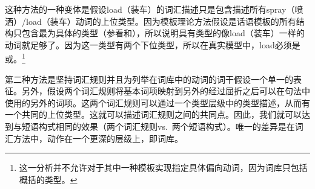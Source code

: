 \begin{exe}
\begin{xlist}[iv.]
\begin{exe}
\begin{xlist}[iv.]
这种方法的一种变体是假设load（装车）的词汇描述只是包含描述所有spray（喷洒）/load（装车）动词的上位类型。因为模板理论方法假设是话语模板的所有结构只包含最为具体的类型（参看和），所以说明具有类型的像load（装车）一样的动词就足够了。因为这一类型有两个下位类型，所以在真实模型中，load必须是或。\footnote{
	这一分析并不允许对于其中一种模板实现指定具体偏向动词，因为词库只包括概括的类型。
}

第二种方法是坚持词汇规则并且为列举在词库中的动词的词干假设一个单一的表征。另外，假设两个词汇规则将基本词项映射到另外的经过屈折之后可以在句法中使用的另外的词项。这两个词汇规则可以通过一个类型层级中的类型描述，从而有一个共同的上位类型。这就可以描述词汇规则之间的共同点。因此，我们就可以达到与短语构式相同的效果（两个词汇规则vs.\ 两个短语构式）。唯一的差异是在词汇方法中，动作在一个更深的层级上，即词库\citep[--406]{Mueller2002b}。


\end{xlist}
\end{exe}
\end{xlist}
\end{exe}
